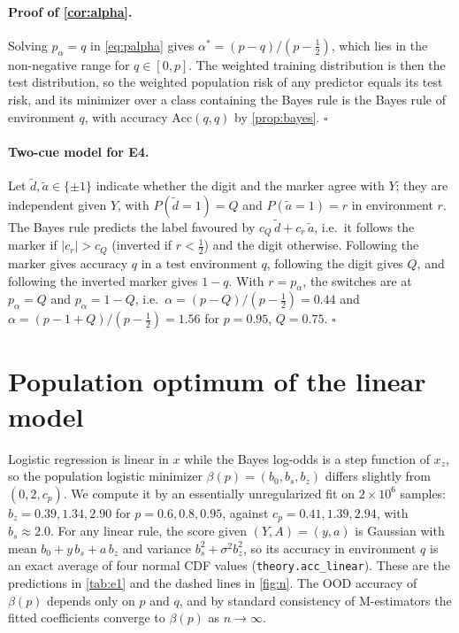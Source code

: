 \documentclass{article}
\newcommand{\Acc}{\mathrm{Acc}}
\begin{document}
\paragraph{Proof of \cref{cor:alpha}.} Solving $p_\alpha=q$ in \eqref{eq:palpha} gives
$\alpha^*=(p-q)/(p-\tfrac12)$, which lies in the non-negative range for $q\in[0,p]$. The weighted
training distribution is then the test distribution, so the weighted population risk of any predictor
equals its test risk, and its minimizer over a class containing the Bayes rule is the Bayes rule of
environment $q$, with accuracy $\Acc(q,q)$ by \cref{prop:bayes}. \hfill$\square$

\paragraph{Two-cue model for E4.} Let $\tilde d,\tilde a\in\{\pm1\}$ indicate whether the digit and
the marker agree with $Y$; they are independent given $Y$, with $P(\tilde d=1)=Q$ and
$P(\tilde a=1)=r$ in environment $r$. The Bayes rule predicts the label favoured by
$c_Q\,\tilde d+c_r\,\tilde a$, i.e.\ it follows the marker if $|c_r|>c_Q$ (inverted if $r<\tfrac12$)
and the digit otherwise. Following the marker gives accuracy $q$ in a test environment $q$, following
the digit gives $Q$, and following the inverted marker gives $1-q$. With $r=p_\alpha$, the switches are
at $p_\alpha=Q$ and $p_\alpha=1-Q$, i.e.\ $\alpha=(p-Q)/(p-\tfrac12)=0.44$ and
$\alpha=(p-1+Q)/(p-\tfrac12)=1.56$ for $p=0.95$, $Q=0.75$. \hfill$\square$

\section{Population optimum of the linear model}
\label{app:linear}

Logistic regression is linear in $x$ while the Bayes log-odds is a step function of $x_z$, so the
population logistic minimizer $\beta(p)=(b_0,b_s,b_z)$ differs slightly from $(0,2,c_p)$. We compute it
by an essentially unregularized fit on $2\times10^6$ samples: $b_z=0.39,1.34,2.90$ for
$p=0.6,0.8,0.95$, against $c_p=0.41,1.39,2.94$, with $b_s\approx2.0$. For any linear rule, the score
given $(Y,A)=(y,a)$ is Gaussian with mean $b_0+y\,b_s+a\,b_z$ and variance $b_s^2+\sigma^2b_z^2$, so its
accuracy in environment $q$ is an exact average of four normal CDF values
(\texttt{theory.acc\_linear}). These are the predictions in \cref{tab:e1} and the dashed lines in
\cref{fig:n}. The OOD accuracy of $\beta(p)$ depends only on $p$ and $q$, and by standard consistency
of M-estimators the fitted coefficients converge to $\beta(p)$ as $n\to\infty$.
\end{document}
